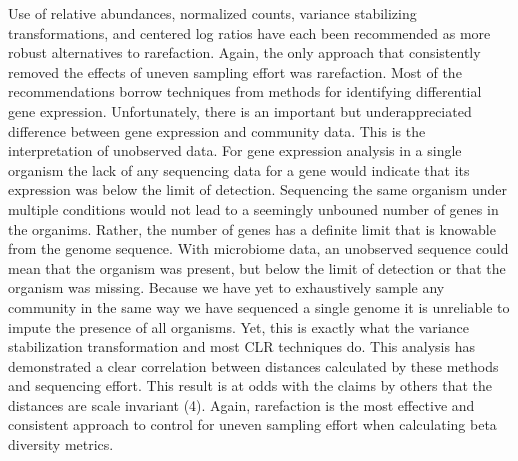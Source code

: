 \documentclass[
]{article}
\begin{document}
Use of relative abundances, normalized counts, variance stabilizing
transformations, and centered log ratios have each been recommended as
more robust alternatives to rarefaction. Again, the only approach that
consistently removed the effects of uneven sampling effort was
rarefaction. Most of the recommendations borrow techniques from methods
for identifying differential gene expression. Unfortunately, there is an
important but underappreciated difference between gene expression and
community data. This is the interpretation of unobserved data. For gene
expression analysis in a single organism the lack of any sequencing data
for a gene would indicate that its expression was below the limit of
detection. Sequencing the same organism under multiple conditions would
not lead to a seemingly unbouned number of genes in the organims.
Rather, the number of genes has a definite limit that is knowable from
the genome sequence. With microbiome data, an unobserved sequence could
mean that the organism was present, but below the limit of detection or
that the organism was missing. Because we have yet to exhaustively
sample any community in the same way we have sequenced a single genome
it is unreliable to impute the presence of all organisms. Yet, this is
exactly what the variance stabilization transformation and most CLR
techniques do. This analysis has demonstrated a clear correlation
between distances calculated by these methods and sequencing effort.
This result is at odds with the claims by others that the distances are
scale invariant (4). Again, rarefaction is the most effective and
consistent approach to control for uneven sampling effort when
calculating beta diversity metrics.
\end{document}
